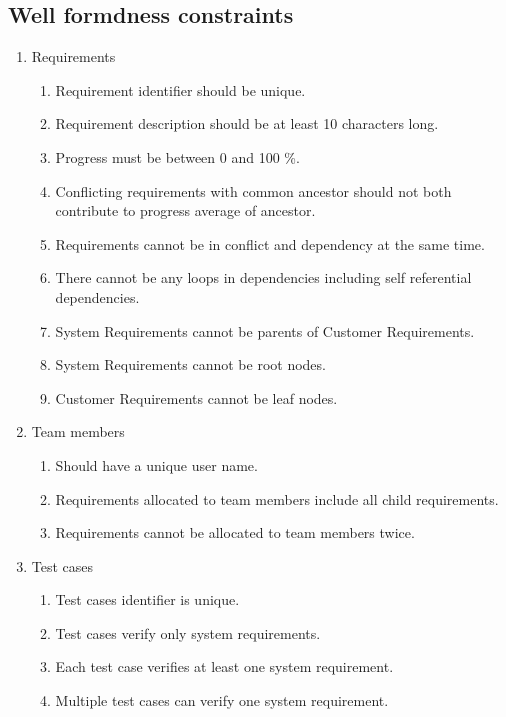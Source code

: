 \documentclass[11pt,a4paper]{scrartcl}
\begin{document}
\subsection{Well formdness constraints}
\begin{enumerate}
	\item Requirements
	\begin{enumerate}
		\item Requirement identifier should be unique.
		\item Requirement description should be at least 10 characters long.
		\item Progress must be between 0 and 100 \%.
		\item Conflicting requirements with common ancestor should not both contribute to progress average of ancestor.
		
		\item Requirements cannot be in conflict and dependency at the same time.
		
		\item There cannot be any loops in dependencies including self referential dependencies.
		
		\item System Requirements cannot be parents of Customer Requirements.
		\item System Requirements cannot be root nodes.
		\item Customer Requirements cannot be leaf nodes.
	\end{enumerate}
	
	\item Team members
	\begin{enumerate}
		\item Should have a unique user name.
		\item Requirements allocated to team members include all child requirements.
		\item Requirements cannot be allocated to team members twice.
	\end{enumerate}
	
	\item Test cases
	\begin{enumerate}
		\item Test cases identifier is unique.
		\item Test cases verify only system requirements.
		\item Each test case verifies at least one system requirement.
		\item Multiple test cases can verify one system requirement.
	\end{enumerate}
\end{enumerate}
\end{document}
